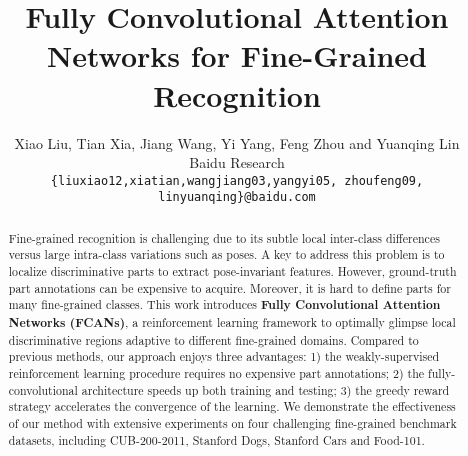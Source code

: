 \documentclass[10pt,twocolumn,letterpaper]{article}
\begin{document}
\title{Fully Convolutional Attention Networks for Fine-Grained Recognition}

\author{Xiao Liu, Tian Xia, Jiang Wang, Yi Yang, Feng Zhou and Yuanqing Lin\\
Baidu Research\\
{\tt\small \{liuxiao12,xiatian,wangjiang03,yangyi05, zhoufeng09, linyuanqing\}@baidu.com}
}

\maketitle


\begin{abstract}
Fine-grained recognition is challenging due to its subtle local inter-class differences versus large intra-class variations such as poses.
A key to address this problem is to localize discriminative parts to extract pose-invariant features.
However, ground-truth part annotations can be expensive to acquire.
Moreover, it is hard to define parts for many fine-grained classes.
This work introduces \textbf{Fully Convolutional Attention Networks (FCANs)}, a reinforcement learning framework to optimally glimpse local discriminative regions adaptive to different fine-grained domains.
Compared to previous methods, our approach enjoys three advantages:
1) the weakly-supervised reinforcement learning procedure requires no expensive part annotations;
2) the fully-convolutional architecture speeds up both training and testing;
3) the greedy reward strategy accelerates the convergence of the learning.
We demonstrate the effectiveness of our method with extensive experiments on four challenging fine-grained benchmark datasets, including CUB-200-2011, Stanford Dogs, Stanford Cars and Food-101.
\end{abstract}
\end{document}
